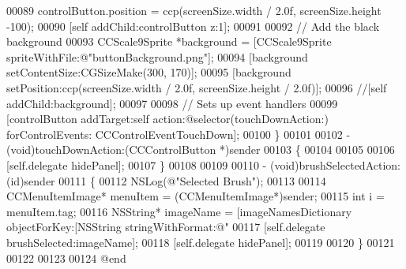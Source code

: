 \begin{DoxyCode}
00089     controlButton.position = ccp(screenSize.width / 2.0f, screenSize.height -100);
00090     [\textcolor{keyword}{self} addChild:controlButton z:1];
00091     
00092     \textcolor{comment}{// Add the black background}
00093     CCScale9Sprite *background = [CCScale9Sprite spriteWithFile:@"buttonBackground.png"];
00094     [background setContentSize:CGSizeMake(300, 170)];
00095     [background setPosition:ccp(screenSize.width / 2.0f, screenSize.height / 2.0f)];
00096     \textcolor{comment}{//[self addChild:background];}
00097     
00098     \textcolor{comment}{// Sets up event handlers}
00099     [controlButton addTarget:self action:@selector(touchDownAction:) forControlEvents:
      CCControlEventTouchDown];
00100 \}
00101 
00102 - (void)touchDownAction:(CCControlButton *)sender
00103 \{
00104 
00105 
00106     [\textcolor{keyword}{self}.delegate hidePanel];
00107 \}
00108 
00109 
00110 - (void)brushSelectedAction:(\textcolor{keywordtype}{id})sender
00111 \{
00112     NSLog(\textcolor{stringliteral}{@"Selected Brush"});
00113     
00114     CCMenuItemImage* menuItem =     (CCMenuItemImage*)sender;
00115     \textcolor{keywordtype}{int} i = menuItem.tag;
00116     NSString* imageName = [imageNamesDictionary objectForKey:[NSString stringWithFormat:@"%
00117     [\textcolor{keyword}{self}.delegate brushSelected:imageName];
00118     [\textcolor{keyword}{self}.delegate hidePanel];
00119     
00120 \}
00121 
00122 
00123 
00124 \textcolor{keyword}{@end}
\end{DoxyCode}
